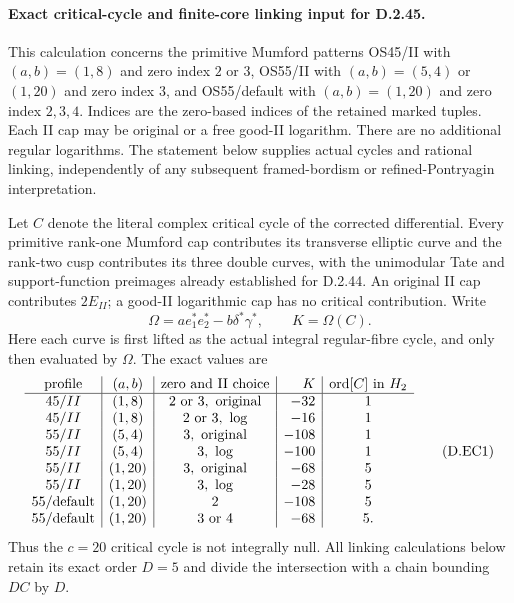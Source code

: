 \paragraph{Exact critical-cycle and finite-core linking input for D.2.45.}
This calculation concerns the primitive Mumford patterns
OS45/II with $(a,b)=(1,8)$ and zero index $2$ or $3$,
OS55/II with $(a,b)=(5,4)$ or $(1,20)$ and zero index $3$,
and OS55/default with $(a,b)=(1,20)$ and zero index
$2,3,4$. Indices are the zero-based indices of the retained
marked tuples. Each II cap may be original or a free good-II
logarithm. There are no additional regular logarithms.
The statement below supplies actual cycles and rational
linking, independently of any subsequent framed-bordism
or refined-Pontryagin interpretation.

Let $C$ denote the literal complex critical cycle of the
corrected differential. Every primitive rank-one Mumford
cap contributes its transverse elliptic curve and the
rank-two cusp contributes its three double curves,
with the unimodular Tate and support-function preimages
already established for D.2.44. An original II cap
contributes $2E_{II}$; a good-II logarithmic cap has no
critical contribution. Write
\[
 \Omega=a e_1^*e_2^*-b\delta^*\gamma^*,\qquad K=\Omega(C).
\]
Here each curve is first lifted as the actual integral
regular-fibre cycle, and only then evaluated by $\Omega$.
The exact values are
\[
\begin{array}{c|c|c|r|c}
\hbox{profile}&(a,b)&\hbox{zero and II choice}&K&
                   \operatorname{ord}[C]\text{ in }H_2\\\hline
45/II&(1,8)&2\text{ or }3,\ \mathrm{original}&-32&1\\
45/II&(1,8)&2\text{ or }3,\ \mathrm{log}&-16&1\\
55/II&(5,4)&3,\ \mathrm{original}&-108&1\\
55/II&(5,4)&3,\ \mathrm{log}&-100&1\\
55/II&(1,20)&3,\ \mathrm{original}&-68&5\\
55/II&(1,20)&3,\ \mathrm{log}&-28&5\\
55/\mathrm{default}&(1,20)&2&-108&5\\
55/\mathrm{default}&(1,20)&3\text{ or }4&-68&5.
\end{array}                                                   \tag{D.EC1}
\]
Thus the $c=20$ critical cycle is not integrally null.
All linking calculations below retain its exact order
$D=5$ and divide the intersection with a chain bounding
$DC$ by $D$.

